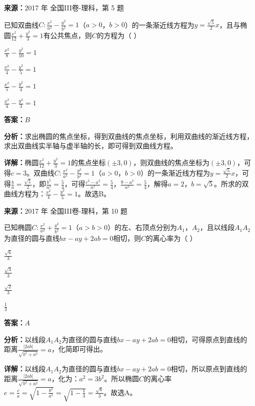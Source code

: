 \begin{question}[points=5]
\textbf{来源：}2017 年 全国III卷-理科，第 5 题\par
已知双曲线$C:\frac{x^2}{a^2}-\frac{y^2}{b^2}=1$（$a>0$，$b>0$）的一条渐近线方程为$y=\frac{\sqrt{5}}{2}x$，且与椭圆$\frac{x^2}{12}+\frac{y^2}{3}=1$有公共焦点，则$C$的方程为（ ）
\begin{choices}
  \item $\frac{x^2}{8}-\frac{y^2}{10}=1$
  \item $\frac{x^2}{4}-\frac{y^2}{5}=1$
  \item $\frac{x^2}{5}-\frac{y^2}{4}=1$
  \item $\frac{x^2}{4}-\frac{y^2}{3}=1$
\end{choices}
\begin{solution}
\textbf{答案：}$B$

\textbf{分析：}求出椭圆的焦点坐标，得到双曲线的焦点坐标，利用双曲线的渐近线方程，求出双曲线实半轴与虚半轴的长，即可得到双曲线方程。

\textbf{详解：}椭圆$\frac{x^2}{12}+\frac{y^2}{3}=1$的焦点坐标$(\pm 3,0)$，则双曲线的焦点坐标为$(\pm 3,0)$，可得$c=3$。双曲线$C:\frac{x^2}{a^2}-\frac{y^2}{b^2}=1$（$a>0$，$b>0$）的一条渐近线方程为$y=\frac{\sqrt{5}}{2}x$，可得$\frac{b}{a}=\frac{\sqrt{5}}{2}$，即$\frac{b^2}{a^2}=\frac{5}{4}$，可得$\frac{c^2-a^2}{a^2}=\frac{5}{4}$，$\frac{9-a^2}{a^2}=\frac{5}{4}$，解得$a=2$，$b=\sqrt{5}$。所求的双曲线方程为：$\frac{x^2}{4}-\frac{y^2}{5}=1$。故选B。
\end{solution}
\end{question}

\begin{question}[points=5]
\textbf{来源：}2017 年 全国III卷-理科，第 10 题\par
已知椭圆$C:\frac{x^2}{a^2}+\frac{y^2}{b^2}=1$（$a>b>0$）的左、右顶点分别为$A_1$，$A_2$，且以线段$A_1A_2$为直径的圆与直线$bx-ay+2ab=0$相切，则$C$的离心率为（ ）
\begin{choices}
  \item $\frac{\sqrt{6}}{3}$
  \item $\frac{\sqrt{3}}{3}$
  \item $\frac{\sqrt{2}}{3}$
  \item $\frac{1}{3}$
\end{choices}
\begin{solution}
\textbf{答案：}$A$

\textbf{分析：}以线段$A_1A_2$为直径的圆与直线$bx-ay+2ab=0$相切，可得原点到直线的距离$\frac{|2ab|}{\sqrt{b^2+a^2}}=a$，化简即可得出。

\textbf{详解：}以线段$A_1A_2$为直径的圆与直线$bx-ay+2ab=0$相切，所以原点到直线的距离$\frac{|2ab|}{\sqrt{b^2+a^2}}=a$，化为：$a^2=3b^2$。所以椭圆$C$的离心率$e=\frac{c}{a}=\sqrt{1-\frac{b^2}{a^2}}=\sqrt{1-\frac{1}{3}}=\frac{\sqrt{6}}{3}$。故选A。
\end{solution}
\end{question}

